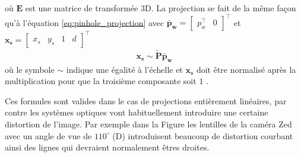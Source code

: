 où $\boldsymbol{E}$ est une matrice de transformée 3D. La projection se fait de la même façon qu'à l'équation \ref{eq:pinhole_projection} avec $\boldsymbol{\bar{p}_w} = \begin{bmatrix}p_w^\top & 0 \end{bmatrix}^\top$ et $\boldsymbol{x_s} = \begin{bmatrix}x_s & y_s & 1 & d\end{bmatrix}^\top$
\begin{align}
  \boldsymbol{x_s} \sim \boldsymbol{\tilde{P}} \boldsymbol{\bar{p}_w}
\end{align}
où le symbole $\sim$ indique une égalité à l'échelle et $\boldsymbol{x_s}$ doit être normalisé après la multiplication pour que la troisième composante soit $1$ \citep{Szeliski2011}.

Ces formules sont valides dans le cas de projections entièrement linéaires, par contre les systèmes optiques vont habituellement introduire une certaine distortion de l'image. Par exemple dans la Figure \label{fig:distortion} les lentilles de la caméra Zed avec un angle de vue de $110^\circ$ (D) introduisent beaucoup de distortion courbant ainsi des lignes qui devraient normalement êtres droites.

